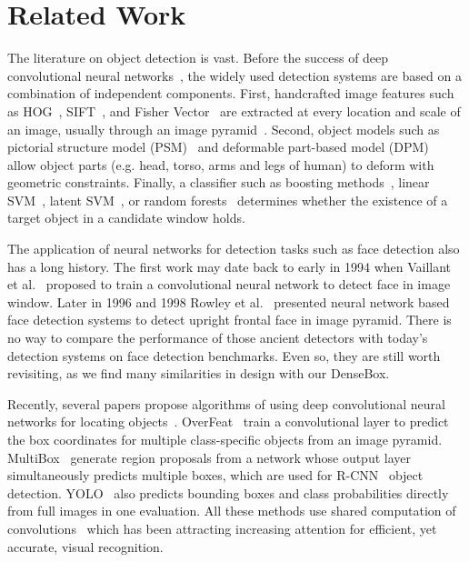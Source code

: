 \section{Related Work}
The literature on object detection is vast. Before the success of deep convolutional neural networks~\cite{krizhevsky2012imagenet}, the widely used detection systems are based on a combination of independent components. First, handcrafted image features such as HOG~\cite{dalal2005histograms,zhang2011boosted,yu2010object}, SIFT~\cite{lowe2004distinctive}, and Fisher Vector~\cite{cinbis2013segmentation} are extracted at every location and scale of an image, usually through an image pyramid~\cite{lazebnik2006beyond}. Second, object models such as pictorial structure model (PSM)~\cite{felzenszwalb2005pictorial} and deformable part-based model (DPM)~\cite{felzenszwalb2010object, zhu2012face, yang2013articulated} allow object parts (e.g. head, torso, arms and legs of human) to deform with geometric constraints. Finally, a classifier such as boosting methods~\cite{viola2004robust}, linear SVM~\cite{dalal2005histograms}, latent SVM~\cite{felzenszwalb2010object}, or random forests~\cite{dollar2012crosstalk} determines whether the existence of a target object in a candidate window holds. 

The application of neural networks for detection tasks such as face detection also has a long history. The first work may date back to early in 1994 when Vaillant et al.~\cite{vaillant1994original} proposed to train a convolutional neural network to detect face in image window. Later in 1996 and 1998 Rowley et al.~\cite{rowley1998neural,rowley1998rotation} presented neural network based face detection systems to detect upright frontal face in image pyramid. There is no way to compare the performance of those ancient detectors with today’s detection systems on face detection benchmarks. Even so, they are still worth revisiting, as we find many similarities in design with our DenseBox. 

Recently, several papers propose algorithms of using deep convolutional neural networks for locating objects~\cite{sermanet2013overfeat, erhan2014scalable, YOLO}. OverFeat~\cite{sermanet2013overfeat} train a convolutional layer to predict the box coordinates for multiple class-specific objects from an image pyramid. MultiBox~\cite{erhan2014scalable} generate region proposals from a network whose output layer simultaneously predicts multiple boxes, which are used for R-CNN~\cite{girshick2014rich} object detection. YOLO~\cite{YOLO} also predicts bounding boxes and class probabilities directly from full images in one evaluation. All these methods use shared computation of convolutions~\cite{sermanet2013overfeat, he2014spatial, ren2015faster, long2015fully} which has been attracting increasing attention for efficient, yet accurate, visual recognition. 

